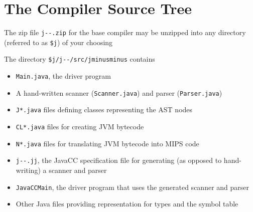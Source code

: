 \documentclass[8pt,a4paper,compress]{beamer}
\begin{document}
\section{The \protect \jmm Compiler Source Tree}
\begin{frame}[fragile]
\pause

The zip file \lstinline{j--.zip} for the base \jmm compiler may be unzipped into any directory (referred to as \lstinline{$j}) of your choosing

\pause\bigskip

The directory \lstinline{$j/j--/src/jminusminus} contains
\begin{itemize}
\pause
\item \lstinline{Main.java}, the driver program

\pause
\item A hand-written scanner (\lstinline{Scanner.java}) and parser (\lstinline{Parser.java})

\pause
\item \lstinline{J*.java} files defining classes representing the AST nodes

\pause
\item \lstinline{CL*.java} files for creating JVM bytecode

\pause
\item \lstinline{N*.java} files for translating JVM bytecode into MIPS code

\pause
\item \lstinline{j--.jj}, the JavaCC specification file for generating (as opposed to hand-writing) a scanner and parser

\pause
\item \lstinline{JavaCCMain}, the driver program that uses the generated scanner and parser

\pause
\item Other Java files providing representation for types and the symbol table
\end{itemize}
\end{frame}
\end{document}
